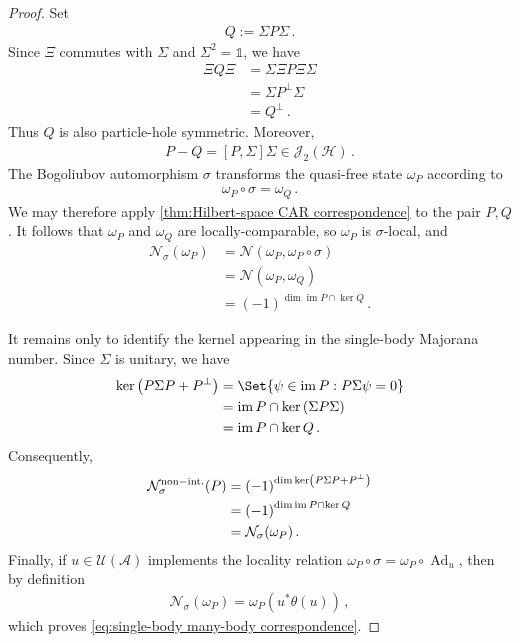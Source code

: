 \documentclass[a4paper,10pt]{article}
\numberwithin{equation}{section}
\theoremstyle{plain}
\newtheorem{thm}{\protect\theoremname}[section]
\theoremstyle{plain}
\theoremstyle{plain}
\theoremstyle{plain}
\theoremstyle{plain}
\theoremstyle{remark}
\theoremstyle{definition}
\providecommand{\theoremname}{Theorem}
\newcommand{\calA}{\mathcal{A}}
\newcommand{\calN}{\mathcal{N}}
\newcommand{\calU}{\mathcal{U}}
\newcommand{\calH}{\mathcal{H}}
\newcommand{\calJ}{\mathcal{J}}
\newcommand{\Ad}[1]{\operatorname{Ad}_{#1}}
\newcommand{\Id}{\mathds{1}}
\newcommand{\im}{\operatorname{im}}
\newcommand{\eq}[1]{\begin{align*}#1\end{align*}}
\newcommand{\eql}[1]{\begin{align}#1\end{align}}
\newcommand{\br}[1]{\left(#1\right)}
\begin{document}
\begin{proof}
Set
\eql{
    Q:=\Sigma P\Sigma\,.
}
Since $\Xi$ commutes with $\Sigma$ and $\Sigma^2=\Id$, we have
\eq{
    \Xi Q\Xi
    &=
    \Sigma\Xi P\Xi\Sigma\\
    &=
    \Sigma P^\perp\Sigma\\
    &=
    Q^\perp\,.
}
Thus $Q$ is also particle-hole symmetric. Moreover,
\eql{
    P-Q=[P,\Sigma]\Sigma\in\calJ_2(\calH)\,.
}
The Bogoliubov automorphism $\sigma$ transforms the quasi-free state
$\omega_P$ according to
\eql{
    \omega_P\circ\sigma=\omega_Q\,.
}
We may therefore apply
\cref{thm:Hilbert-space CAR correspondence} to the pair $P,Q$. It
follows that $\omega_P$ and $\omega_Q$ are locally-comparable, so
$\omega_P$ is $\sigma$-local, and
\eq{
    \calN_\sigma(\omega_P)
    &=
    \calN(\omega_P,\omega_P\circ\sigma)\\
    &=
    \calN(\omega_P,\omega_Q)\\
    &=
    \br{-1}^{\dim\im P\cap\ker Q}\,.
}

It remains only to identify the kernel appearing in the single-body
Majorana number. Since $\Sigma$ is unitary, we have
\eq{
    \ker\br{P\Sigma P+P^\perp}
    &=
    \Set{\psi\in\im P:P\Sigma\psi=0}\\
    &=
    \im P\cap\ker\br{\Sigma P\Sigma}\\
    &=
    \im P\cap\ker Q\,.
}
Consequently,
\eq{
    \calN_\sigma^{\rm non-int.}(P)
    &=
    \br{-1}^{\dim\ker\br{P\Sigma P+P^\perp}}\\
    &=
    \br{-1}^{\dim\im P\cap\ker Q}\\
    &=
    \calN_\sigma(\omega_P)\,.
}
Finally, if $u\in\calU(\calA)$ implements the locality relation
$\omega_P\circ\sigma=\omega_P\circ\Ad{u}$, then by definition
\eql{
    \calN_\sigma(\omega_P)
    =
    \omega_P\br{u^\ast\theta(u)}\, ,
}
which proves \cref{eq:single-body many-body correspondence}.
\end{proof}



\end{document}
